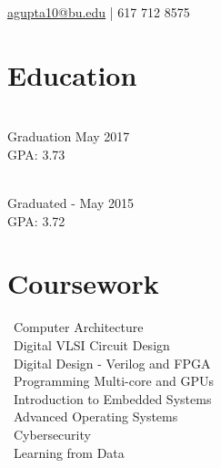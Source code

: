 \documentclass[]{deedy_format_Anmol}
\begin{document}
%
%
\lastupdated

%
%


{\href{mailto:agupta10@bu.edu}{agupta10@bu.edu} | 617 712 8575
}

%
%

\begin{minipage}[t]{0.325\textwidth} 


\section{Education} 
\vspace{0.5mm} %
\\
Graduation May 2017 \\ GPA: 3.73
\sectionsep

\\		
Graduated - May 2015 \\ GPA: 3.72
\sectionsep

\sectionsep

\section{Coursework}
\vspace{0.5mm} %
\flushleft
\textbullet \, Computer Architecture\\
\textbullet \, Digital VLSI Circuit Design\\
\textbullet \, Digital Design - Verilog and FPGA\\
\textbullet \, Programming Multi-core and GPUs\\
\textbullet \, Introduction to Embedded Systems\\
\textbullet \, Advanced Operating Systems\\
\textbullet \, Cybersecurity\\
\textbullet \, Learning from Data
\sectionsep



\end{minipage}
\end{document}
